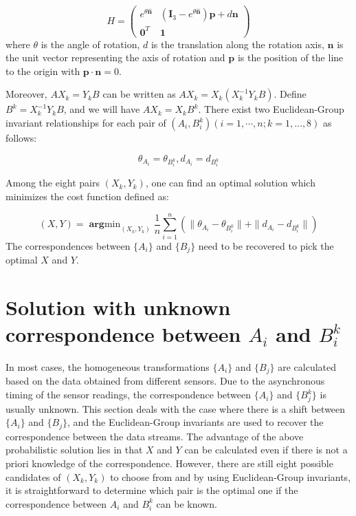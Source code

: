 \documentclass[letterpaper, 10 pt, conference]{ieeeconf}  %
\begin{document}
\begin{equation}\label{equ21}
H = \left( \begin{array}{cc}
       e^{\theta \hat{\mathbf{n}}} & (\mathbf{I}_{3} - e^{\theta \hat{\mathbf{n}}})\mathbf{p} + d\mathbf{n} \\
       \mathbf{0}^{T} & \mathbf{1}
\end{array} \right)
\end{equation}
where $\theta$ is the angle of rotation, $d$ is the translation along the rotation axis, $\mathbf{n}$ is the unit vector representing the axis of rotation and $\mathbf{p}$ is the position of the line to the origin with $\mathbf{p} \cdot \mathbf{n} = 0$.

Moreover, $A X_k = Y_k B$ can be written as $AX_k=X_k(X_k^{-1}Y_kB)$. Define $B^k = X_k^{-1}Y_kB$, and we will have $AX_k=X_kB^k$. There exist two Euclidean-Group invariant relationships for each pair of $(A_{i},B_{i}^k)( i = 1,\cdots,n; k=1,\dots,8)$ as follows:

\begin{equation}\label{equ22}
    \theta_{A_{i}}=\theta_{B_{i}^{k}}, d_{A_{i}}=d_{B_{i}^{k}}
\end{equation}

Among the eight pairs $(X_{k},Y_{k})$, one can find an optimal solution which  minimizes the cost function defined as:

\begin{equation}\label{equ23}
    (X,Y) = \mathop{\mathbf{arg}min}_{(X_{k},Y_{k})}\frac{1}{n} \sum_{i=1}^{n} (\parallel \theta_{A_{i}}-\theta_{B_{i}^{k}} \parallel + \parallel d_{A_{i}}-d_{B_{i}^{k}} \parallel)
\end{equation}
The correspondences between $\{A_i\}$ and $\{B_j\}$ need to be recovered to pick the optimal $X$ and $Y$.
\section{Solution with unknown correspondence between $A_{i}$ and $B_{i}^{k}$}
\label{sect3}

In most cases, the homogeneous transformations  $\{A_i\}$ and $\{B_j\}$ are calculated based on the data obtained from different sensors. Due to the asynchronous timing of the sensor readings, the correspondence between $\{A_{i}\}$ and $\{B_{j}^{k}\}$ is usually unknown. This section deals with the case where there is a shift between $\{A_i\}$ and $\{B_j\}$, and the Euclidean-Group invariants are used to recover the correspondence between the data streams. The advantage of the above probabilistic solution lies in that $X$ and $Y$ can be calculated even if there is not a priori knowledge of the correspondence. However, there are still eight possible candidates of $(X_{k},Y_{k})$ to choose from and by using Euclidean-Group invariants, it is straightforward to determine which pair is the optimal one if the correspondence between $A_{i}$ and $B_{i}^{k}$ can be known.
\end{document}
